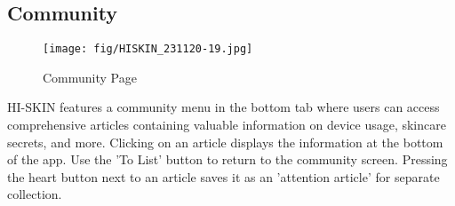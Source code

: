 \documentclass[conference]{IEEEtran}
\begin{document}
\subsection{Community} 
\begin{figure}[htb!]
    \centering
    \texttt{[image: fig/HISKIN\_231120-19.jpg]}
    \label{fig:Community Page}
    \caption{Community Page} 
    \end{figure}
HI-SKIN features a community menu in the bottom tab where users can access comprehensive articles containing valuable information on device usage, skincare secrets, and more. Clicking on an article displays the information at the bottom of the app. Use the 'To List' button to return to the community screen. Pressing the heart button next to an article saves it as an 'attention article' for separate collection. \\
\end{document}
